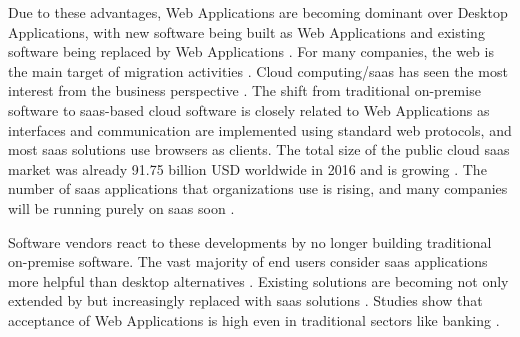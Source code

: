Due to these advantages, \glspl{Web Application} are becoming dominant over \glspl{Desktop Application}, with new software being built as \glspl{Web Application} \autocite{BetterCloud2017SaaSWorkplace} and existing software being replaced by \glspl{Web Application} \autocite{Gartner2012SaaSSurvey}.
For many companies, the \Gls{web} is the main target of migration activities \autocite{Torchiano2008ItalianSurvey}.
Cloud computing/\gls{saas} has seen the most interest from the business perspective \autocite{Statista2018SaaSStatistics}.
The shift from traditional on-premise software to \gls{saas}-based cloud software is closely related to \glspl{Web Application} as interfaces and communication are implemented using standard \Gls{web} protocols, and most \gls{saas} solutions use browsers as clients.
The total size of the public cloud \gls{saas} market was already 91.75 billion USD worldwide in 2016 \autocite{Statista2018SaaSMarketSize} and is growing \autocite{Statista2018SaaSMarketSize,BetterCloud2017SaaSWorkplace,Chan2018SaaSStatistics}.
The number of \gls{saas} applications that organizations use is rising, and many companies will be running purely on \gls{saas} soon \autocite{BetterCloud2017SaaSWorkplace}.

Software vendors react to these developments by no longer building traditional on-premise software.
The vast majority of end users consider \gls{saas} applications more helpful than desktop alternatives \autocite{BetterCloud2017SaaSWorkplace}.
Existing solutions are becoming not only extended by but increasingly replaced with \gls{saas} solutions \autocite{Gartner2012SaaSSurvey}.
Studies show that acceptance of \glspl{Web Application} is high even in traditional sectors like banking \autocite{BitkomResearch2016DigitalBanking}.

